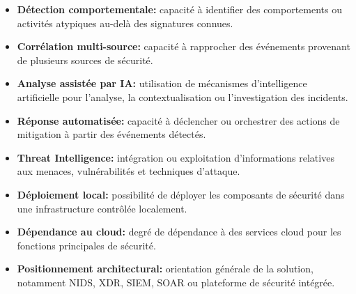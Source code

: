 \begin{itemize}
    \item \textbf{Détection comportementale:} capacité à identifier des
    comportements ou activités atypiques au-delà des signatures connues.
    
    \item \textbf{Corrélation multi-source:} capacité à rapprocher des
    événements provenant de plusieurs sources de sécurité.
    
    \item \textbf{Analyse assistée par IA:} utilisation de mécanismes
    d'intelligence artificielle pour l'analyse, la contextualisation ou
    l'investigation des incidents.
    
    \item \textbf{Réponse automatisée:} capacité à déclencher ou orchestrer
    des actions de mitigation à partir des événements détectés.
    
    \item \textbf{Threat Intelligence:} intégration ou exploitation
    d'informations relatives aux menaces, vulnérabilités et techniques
    d'attaque.
    
    \item \textbf{Déploiement local:} possibilité de déployer les
    composants de sécurité dans une infrastructure contrôlée localement.
    
    \item \textbf{Dépendance au cloud:} degré de dépendance à des services cloud pour les fonctions principales de sécurité.
    
    \item \textbf{Positionnement architectural:} orientation générale de la solution, notamment NIDS, XDR, SIEM, SOAR ou plateforme de sécurité
    intégrée.
\end{itemize}

\newpage


